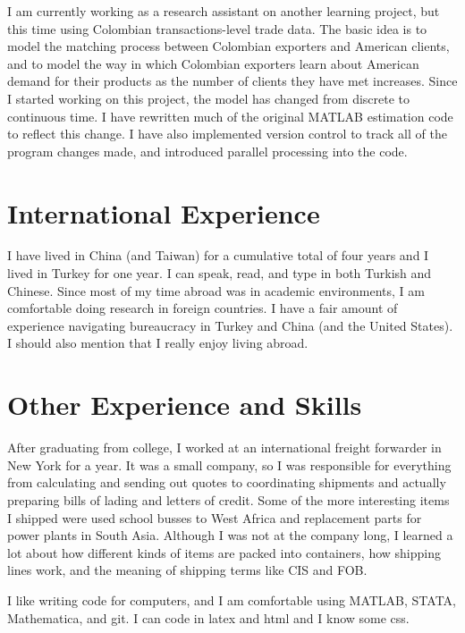 \documentclass[a4paper,10pt]{article}
\begin{document}
I am currently working as a research assistant on another learning project, but this time using Colombian transactions-level trade data.  The basic idea is to model the matching process between Colombian exporters and American clients, and to model the way in which Colombian exporters learn about American demand for their products as the number of clients they have met increases.  Since I started working on this project, the model has changed from discrete to continuous time.  I have rewritten much of the original MATLAB estimation code to reflect this change.  I have also implemented version control to track all of the program changes made, and introduced parallel processing into the code.

\section{International Experience}
I have lived in China (and Taiwan) for a cumulative total of four years and I lived in Turkey for one year.  I can speak, read, and type in both Turkish and Chinese.  Since most of my time abroad was in academic environments, I am comfortable doing research in foreign countries.  I have a fair amount of experience navigating bureaucracy in Turkey and China (and the United States).  I should also mention that I really enjoy living abroad.

\section{Other Experience and Skills}
After graduating from college, I worked at an international freight forwarder in New York for a year.  It was a small company, so I was responsible for everything from calculating and sending out quotes to coordinating shipments and actually preparing bills of lading and letters of credit.  Some of the more interesting items I shipped were used school busses to West Africa and replacement parts for power plants in South Asia.  Although I was not at the company long, I learned a lot about how different kinds of items are packed into containers, how shipping lines work, and the meaning of shipping terms like CIS and FOB.

I like writing code for computers, and I am comfortable using MATLAB, STATA, Mathematica, and git.  I can code in latex and html and I know some css.    
\end{document}
